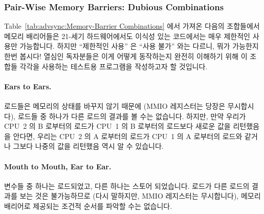 \subsubsection{Pair-Wise Memory Barriers: Dubious Combinations}

Table~\ref{tab:advsync:Memory-Barrier Combinations} 에서 가져온 다음의
조합들에서 메모리 배리어들은 21-세기 하드웨어에서도 이식성 있는 코드에서는 매우
제한적인 사용만 가능합니다. 
하지만 ``제한적인 사용'' 은 ``사용 불가'' 와는 다르니, 뭐가 가능한지 한번
봅시다!
열심인 독자분들은 이게 어떻게 동작하는지 완전히 이해하기 위해 이 조합들 각각을
사용하는 테스트용 프로그램을 작성하고자 할 것입니다.

\paragraph{Ears to Ears.}
	로드들은 메모리의 상태를 바꾸지 않기 때문에 (MMIO 레지스터는 당장은
	무시합시다), 로드들 중 하나가 다른 로드의 결과를 볼 수는 없습니다.
	하지만, 만약 우리가 CPU~2 의 B 로부터의 로드가 CPU~1 의 B 로부터의
	로드보다 새로운 값을 리턴했음을 안다면, 우리는 CPU~2 의 A 로부터의
	로드가 CPU~1 의 A 로부터의 로드와 같거나 그보다 나중의 값을 리턴했음
	역시 알 수 있습니다.

\paragraph{Mouth to Mouth, Ear to Ear.}
	변수들 중 하나는 로드되었고, 다른 하나는 스토어 되었습니다.
	로드가 다른 로드의 결과를 보는 것은 불가능하므로 (다시 말하지만, MMIO
	레지스터는 무시합니다), 메모리 배리어로 제공되는 조건적 순서를 파악할
	수는 없습니다.

